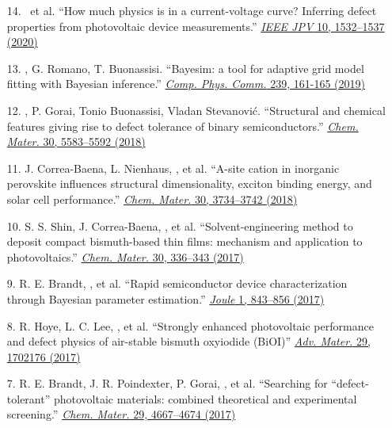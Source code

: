 \begin{enumerate}
        \item[14.] \myname~et al. ``How much physics is in a current-voltage curve? Inferring defect properties from photovoltaic device measurements.'' \href{https://ieeexplore.ieee.org/document/9157971}{\textit{IEEE JPV} 10, 1532--1537 (2020)}

        \item[13.] \myname, G. Romano, T. Buonassisi. ``Bayesim: a tool for adaptive grid model fitting with Bayesian inference.'' \href{https://www.sciencedirect.com/science/article/pii/S0010465519300414?via\%3Dihub}{\textit{Comp. Phys. Comm.} 239, 161-165 (2019)}

        \item[12.] \myname\ec, P. Gorai\ec, Tonio Buonassisi, Vladan Stevanovi\'c. ``Structural and chemical features giving rise to defect tolerance of binary semiconductors.'' \href{https://pubs.acs.org/doi/10.1021/acs.chemmater.8b01505}{\textit{Chem. Mater.} 30, 5583--5592 (2018)}

        \item[11.] J. Correa-Baena, L. Nienhaus, \myname, et al. ``A-site cation in inorganic  perovskite influences structural dimensionality, exciton binding energy, and solar cell performance.'' \href{https://pubs.acs.org/doi/10.1021/acs.chemmater.8b00676}{\textit{Chem. Mater.} 30, 3734--3742 (2018)}

        \item[10.] S. S. Shin, J. Correa-Baena, \myname, et al. ``Solvent-engineering method to deposit compact bismuth-based thin films: mechanism and application to photovoltaics.'' \href{https://pubs.acs.org/doi/10.1021/acs.chemmater.7b03227}{\textit{Chem. Mater.} 30, 336--343 (2017)}

        \item[9.] R. E. Brandt, \myname, et al. ``Rapid semiconductor device characterization through Bayesian parameter estimation.'' \href{https://www.sciencedirect.com/science/article/pii/S254243511730096X?via\%3Dihub}{\textit{Joule} 1, 843--856 (2017)}

        \item[8.] R. Hoye, L. C. Lee, \myname, et al. ``Strongly enhanced photovoltaic performance and defect physics of air-stable bismuth oxyiodide (BiOI)'' \href{https://onlinelibrary.wiley.com/doi/full/10.1002/adma.201702176}{\textit{Adv. Mater.} 29, 1702176 (2017)}        

        \item[7.] R. E. Brandt, J. R. Poindexter, P. Gorai, \myname, et al. ``Searching for “defect-tolerant” photovoltaic materials: combined theoretical and experimental screening.'' \href{https://pubs.acs.org/doi/10.1021/acs.chemmater.6b05496}{\textit{Chem. Mater.} 29, 4667--4674 (2017)}


\end{enumerate}

